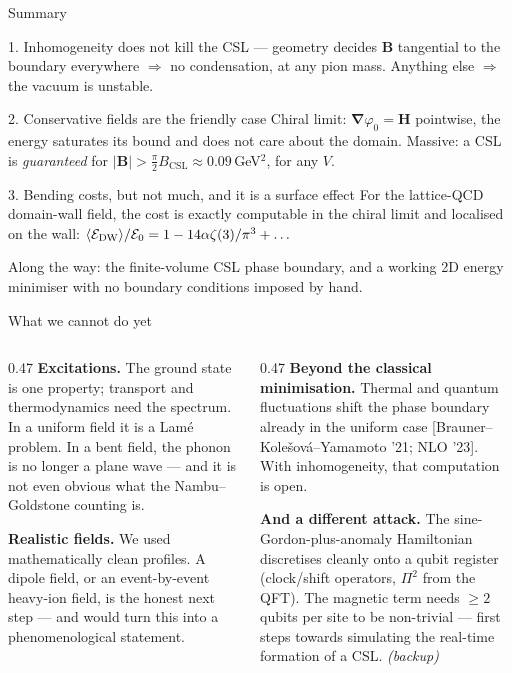 \documentclass[aspectratio=169,10pt]{beamer}
\newcommand{\B}{\bm{B}}
\newcommand{\Hb}{\bm{H}}
\newcommand{\gr}{\bm{\nabla}}
\newcommand{\Bcsl}{B_{\mathrm{CSL}}}
\newcommand{\cit}[1]{{\scriptsize\color{gray}[#1]}}
\begin{document}
\begin{frame}{Summary}
\begin{block}{1. Inhomogeneity does not kill the CSL --- geometry decides}
$\B$ tangential to the boundary everywhere $\Rightarrow$ no condensation, at
any pion mass. Anything else $\Rightarrow$ the vacuum is unstable.
\end{block}
\begin{block}{2. Conservative fields are the friendly case}
Chiral limit: $\gr\varphi_0=\Hb$ pointwise, the energy saturates its bound and
does not care about the domain. Massive: a CSL is \emph{guaranteed} for
$|\B|>\tfrac{\pi}{2}\Bcsl\approx0.09\,$GeV$^2$, for any $V$.
\end{block}
\begin{block}{3. Bending costs, but not much, and it is a surface effect}
For the lattice-QCD domain-wall field, the cost is exactly computable in the
chiral limit and localised on the wall:
$\langle\mathcal E_{\rm DW}\rangle/\mathcal E_0=1-14\alpha\zeta(3)/\pi^3+\dots$
\end{block}
\vspace{1mm}
\centering
{\small Along the way: the finite-volume CSL phase boundary, and a working
2D energy minimiser with no boundary conditions imposed by hand.}
\end{frame}

\begin{frame}{What we cannot do yet}
\begin{columns}[T,onlytextwidth]
\begin{column}{0.47\textwidth}
\textbf{Excitations.}
The ground state is one property; transport and thermodynamics need the
spectrum. In a uniform field it is a Lam\'e problem. In a bent field, the
phonon is no longer a plane wave --- and it is not even obvious what the
Nambu--Goldstone counting is.
\vspace{3mm}

\textbf{Realistic fields.}
We used mathematically clean profiles. A dipole field, or an event-by-event
heavy-ion field, is the honest next step --- and would turn this into a
phenomenological statement.
\end{column}
\hfill
\begin{column}{0.47\textwidth}
\textbf{Beyond the classical minimisation.}
Thermal and quantum fluctuations shift the phase boundary already in the
uniform case \cit{Brauner--Kole\v{s}ov\'a--Yamamoto '21; NLO '23}. With
inhomogeneity, that computation is open.
\vspace{3mm}

\textbf{And a different attack.}
The sine-Gordon-plus-anomaly Hamiltonian discretises cleanly onto a qubit
register (clock/shift operators, $\Pi^2$ from the QFT). The magnetic term
needs $\ge2$ qubits per site to be non-trivial --- first steps towards
simulating the real-time formation of a CSL. \emph{(backup)}
\end{column}
\end{columns}
\end{frame}
\end{document}
